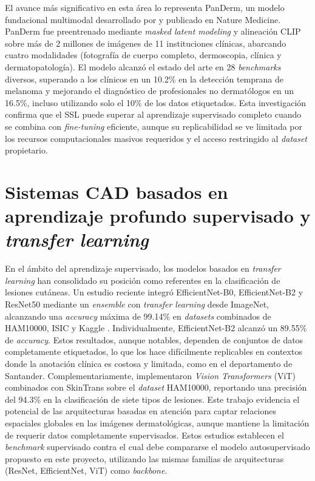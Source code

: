 El avance más significativo en esta área lo representa PanDerm, un modelo fundacional multimodal desarrollado por \textcite{yan2025panderm} y publicado en Nature Medicine. PanDerm fue preentrenado mediante \textit{masked latent modeling} y alineación CLIP sobre más de 2 millones de imágenes de 11 instituciones clínicas, abarcando cuatro modalidades (fotografía de cuerpo completo, dermoscopia, clínica y dermatopatología). El modelo alcanzó el estado del arte en 28 \textit{benchmarks} diversos, superando a los clínicos en un 10.2\% en la detección temprana de melanoma y mejorando el diagnóstico de profesionales no dermatólogos en un 16.5\%, incluso utilizando solo el 10\% de los datos etiquetados. Esta investigación confirma que el SSL puede superar al aprendizaje supervisado completo cuando se combina con \textit{fine-tuning} eficiente, aunque su replicabilidad se ve limitada por los recursos computacionales masivos requeridos y el acceso restringido al \textit{dataset} propietario.

\section{Sistemas CAD basados en aprendizaje profundo supervisado y \textit{transfer learning}}

 En el ámbito del aprendizaje supervisado, los modelos basados en \textit{transfer learning} han consolidado su posición como referentes en la clasificación de lesiones cutáneas. Un estudio reciente integró EfficientNet-B0, EfficientNet-B2 y ResNet50 mediante un \textit{ensemble} con \textit{transfer learning} desde ImageNet, alcanzando una \textit{accuracy} máxima de 99.14\% en \textit{datasets} combinados de HAM10000, ISIC y Kaggle \parencite{alruwaili2025efficientnetresnet}. Individualmente, EfficientNet-B2 alcanzó un 89.55\% de \textit{accuracy}. Estos resultados, aunque notables, dependen de conjuntos de datos completamente etiquetados, lo que los hace difícilmente replicables en contextos donde la anotación clínica es costosa y limitada, como en el departamento de Santander. Complementariamente, \textcite{himel2024skintrans} implementaron \textit{Vision Transformers} (ViT) combinados con SkinTrans sobre el \textit{dataset} HAM10000, reportando una precisión del 94.3\% en la clasificación de siete tipos de lesiones. Este trabajo evidencia el potencial de las arquitecturas basadas en atención para captar relaciones espaciales globales en las imágenes dermatológicas, aunque mantiene la limitación de requerir datos completamente supervisados. Estos estudios establecen el \textit{benchmark} supervisado contra el cual debe compararse el modelo autosupervisado propuesto en este proyecto, utilizando las mismas familias de arquitecturas (ResNet, EfficientNet, ViT) como \textit{backbone}.

